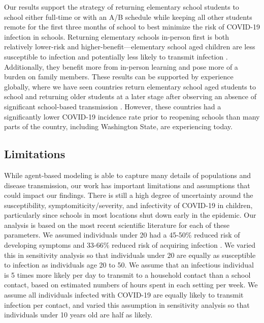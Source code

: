 \documentclass[preprint,12pt]{elsarticle}
\begin{document}
Our results support the strategy of returning elementary school students to school either full-time or with an A/B schedule while keeping all other students remote for the first three months of school to best minimize the risk of COVID-19 infection in schools. Returning elementary schools in-person first is both relatively lower-risk and higher-benefit—elementary school aged children are less susceptible to infection \cite{zhang_changes_2020} and potentially less likely to transmit infection \cite{park_early_nodate}. Additionally, they benefit more from in-person learning and pose more of a burden on family members. These results can be supported by experience globally, where we have seen countries return elementary school aged students to school and returning older students at a later stage after observing an absence of significant school-based transmission \cite{zhang_changes_2020, auger_association_2020}. However, these countries had a significantly lower COVID-19 incidence rate prior to reopening schools than many parts of the country, including Washington State, are experiencing today.

\subsection{Limitations}

While agent-based modeling is able to capture many details of populations and disease transmission, our work has important limitations and assumptions that could impact our findings. There is still a high degree of uncertainty around the susceptibility, symptomiticity/severity, and infectivity of COVID-19 in children, particularly since schools in most locations shut down early in the epidemic. Our analysis is based on the most recent scientific literature for each of these parameters. We assumed individuals under 20 had a 45-50\% reduced risk of developing symptoms \cite{davies_age-dependent_nodate} and 33-66\% reduced risk of acquiring infection \cite{zhang_changes_2020}. We varied this in sensitivity analysis so that individuals under 20 are equally as susceptible to infection as individuals age 20 to 50. We assume that an infectious individual is 5 times more likely per day to transmit to a household contact than a school contact, based on estimated numbers of hours spent in each setting per week. We assume all individuals infected with COVID-19 are equally likely to transmit infection per contact, and varied this assumption in sensitivity analysis so that individuals under 10 years old are half as likely.
\end{document}
